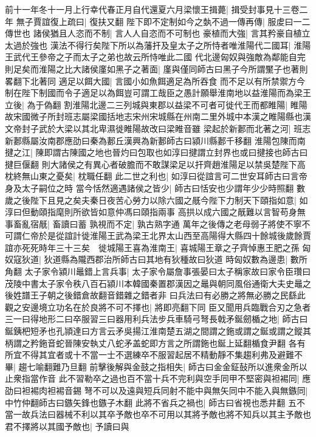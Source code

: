 前十一年冬十一月上行幸代春正月自代還夏六月梁懷王揖薨|{
	揖受封事見十三卷二年}
無子賈誼復上疏曰|{
	復扶又翻}
陛下即不定制如今之埶不過一傳再傳|{
	服䖍曰一二傳世也}
諸侯猶且人恣而不制|{
	言人人自恣而不可制也}
豪植而大強|{
	言其矜豪自植立太過於強也}
漢法不得行矣陛下所以為藩扞及皇太子之所恃者唯淮陽代二國耳|{
	淮陽王武代王參帝之子而太子之弟也故云所恃唯此二國}
代北邊匈奴與強敵為鄰能自完則足矣而淮陽之比大諸侯廑如黑子之著面|{
	廑與僅同師古曰黑子今所謂黶子也著則畧翻下北著同}
適足以餌大國|{
	言國小如魚餌適足為所吞食}
而不足以有所禁禦方今制在陛下制國而令子適足以為餌豈可謂工哉臣之愚計願舉淮南地以益淮陽而為梁王立後|{
	為于偽翻}
割淮陽北邊二三列城與東郡以益梁不可者可徙代王而都睢陽|{
	睢陽故宋國微子所封班志屬梁國括地志宋州宋城縣在州南二里外城中本漢之睢陽縣也漢文帝封子武於大梁以其北卑濕徙睢陽故改曰梁睢音雖}
梁起於新郪而北著之河|{
	班志新郪縣屬汝南郡應劭曰秦為郪丘漢興為新郪師古曰潁川縣郪千移翻}
淮陽包陳而南揵之江|{
	陳即謂古陳國之地也晉灼曰包取也如淳曰揵謂立封界也或曰揵接也師古曰揵巨偃翻}
則大諸侯之有異心者破膽而不敢謀梁足以扞齊趙淮陽足以禁吳楚陛下高枕終無山東之憂矣|{
	枕職任翻}
此二世之利也|{
	如淳曰從誼言可二世安耳師古曰言帝身及太子嗣位之時}
當今恬然適遇諸侯之皆少|{
	師古曰恬安也少謂年少少時照翻}
數歲之後陛下且見之矣夫秦日夜苦心勞力以除六國之旤今陛下力制天下頤指如意|{
	如淳曰但動頤指麾則所欲皆如意仲馮曰頤指兩事}
高拱以成六國之旤難以言智苟身無事畜亂宿旤|{
	畜讀曰蓄}
孰視而不定|{
	孰古熟字通}
萬年之後傳之老母弱子將使不寧不可謂仁帝於是從誼計徙淮陽王武為梁王北界太山西至高陽得大縣四十餘城後歲餘賈誼亦死死時年三十三矣　徙城陽王喜為淮南王|{
	喜城陽王章之子齊悼惠王肥之孫}
匈奴寇狄道|{
	狄道縣為隴西郡治所師古曰其地有狄種故曰狄道}
時匈奴數為邊患|{
	數所角翻}
太子家令潁川鼂錯上言兵事|{
	太子家令屬詹事張晏曰太子稱家故曰家令臣瓚曰茂陵中書太子家令秩八百石潁川本韓國秦置郡漢因之鼂與朝同風俗通衛大夫史鼂之後姓譜王子朝之後錯倉故翻音錯雜之錯者非}
曰兵法曰有必勝之將無必勝之民繇此觀之安邊境立功名在於良將不可不擇也|{
	將即亮翻下同}
臣又聞用兵臨戰合刃之急者三一曰得地形二曰卒服習三曰器用利兵法步兵車騎弓弩長戟矛鋋劒楯之地|{
	師古曰鋋銕杷短矛也孔頴達曰方言云矛吳揚江淮南楚五湖之間謂之鉇或謂之鋋或謂之鏦其柄謂之矜鉇音蛇晉陳安執丈八蛇矛盖蛇即方言之所謂鉇也鋋上延翻楯食尹翻}
各有所宜不得其宜者或十不當一士不選練卒不服習起居不精動靜不集趨利弗及避難不畢|{
	趨七喻翻難乃旦翻}
前擊後解與金鼓之指相失|{
	師古曰金金鉦鼔所以進衆金所以止衆指當作音}
此不習勒卒之過也百不當十兵不完利與空手同甲不堅密與袒裼同|{
	應劭曰袒裼肉袒裼音錫}
弩不可以及遠與短兵同射不能中與無矢同中不能入與無鏃同|{
	中竹仲翻師古曰鏃矢鋒也鏃子木翻}
此將不省兵之禍也|{
	師古曰省視也悉井翻}
五不當一故兵法曰器械不利以其卒予敵也卒不可用以其將予敵也將不知兵以其主予敵也君不擇將以其國予敵也|{
	予讀曰與}
